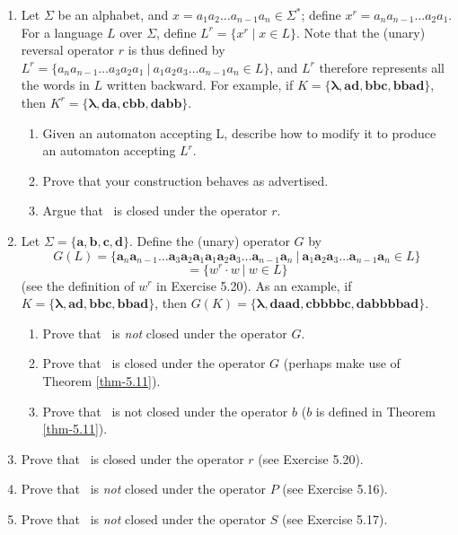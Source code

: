 \begin{enumerate}[{5.}1. ]
\item Let $\Sigma$ be an alphabet, and $x=a_1a_2 \ldots a_{n-1}a_n \in \Sigma^*$;
define $x^r =a_na_{n-1} \ldots a_2a_1$. For a language $L$ over $\Sigma$, define
$L^r=\{x^r \mid x \in L\}$. Note that the (unary) reversal operator $r$ is thus defined
by $L^r=\{a_na_{n-1} \ldots a_3a_2a_1\ |\ a_1a_2a_3 \ldots a_{n-1}a_n \in L\}$, and
$L^r$ therefore represents all the words in $L$ written backward. For example, if
$K=\{\pmb{\lambda},\pmb{ad},\pmb{bbc},\pmb{bbad}\}$, then
$K^r=\{\pmb{\lambda},\pmb{da},\pmb{cbb},\pmb{dabb}\}$.
\begin{enumerate}
\item Given an automaton accepting L, describe how to modify it to produce an
automaton accepting $L^r$.
\item Prove that your construction behaves as advertised.
\item Argue that \DSIG\ is closed under the operator $r$.
\end{enumerate}

\item Let $\Sigma=\{\pmb{a},\pmb{b},\pmb{c},\pmb{d}\}$. Define the (unary)
operator $G$ by
\[ G(L)=\{\pmb{a}_n\pmb{a}_{n-1}\ldots \pmb{a}_3\pmb{a}_2\pmb{a}_1\pmb{a}_1\pmb{a}_2\pmb{a}_3\ldots \pmb{a}_{n-1}\pmb{a}_n\ |\ \pmb{a}_1\pmb{a}_2\pmb{a}_3\ldots
	\pmb{a}_{n-1}\pmb{a}_n \in L\} \]
\[ =\{w^r \cdot w\ |\ w \in L\} \]
(see the definition of $w^r$ in Exercise 5.20). As an example, if
$K=\{\pmb{\lambda},\pmb{ad},\pmb{bbc},\pmb{bbad}\}$, then
$G(K)=\{\pmb{\lambda},\pmb{daad},\pmb{cbbbbc},\pmb{dabbbbad}\}$.
\begin{enumerate}
\item Prove that \DSIG\ is \emph{not} closed under the operator $G$.
\item Prove that \NSIG\ is closed under the operator $G$ (perhaps make use of Theorem \ref{thm-5.11}).
\item Prove that \NSIG\ is not closed under the operator $b$ ($b$ is defined in Theorem \ref{thm-5.11}).
\end{enumerate}

\item Prove that \NSIG\ is closed under the operator $r$ (see Exercise 5.20).

\item Prove that \NSIG\ is \emph{not} closed under the operator $P$ (see
Exercise 5.16).

\item Prove that \NSIG\ is \emph{not} closed under the operator $S$ (see
Exercise 5.17).


\end{enumerate}
